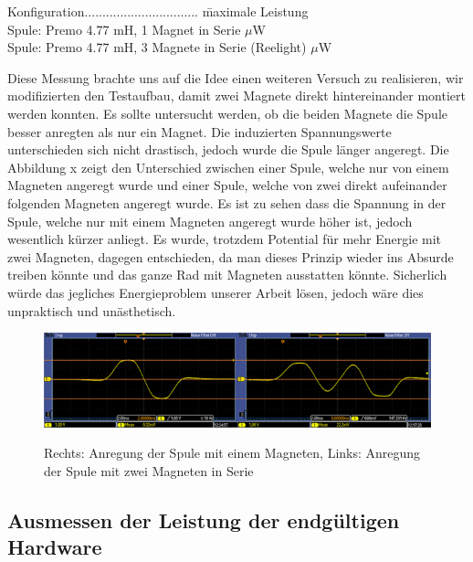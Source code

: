 \begin{tabbing}
    Konfiguration................................   \quad\= maximale Leistung    \\[0.8ex]
    Spule: Premo 4.77 mH, 1 Magnet in Serie         $\mu$W\\
	Spule: Premo 4.77 mH, 3 Magnete in Serie (Reelight)         $\mu$W\\	
\end{tabbing} %


Diese Messung brachte uns auf die Idee einen weiteren Versuch zu realisieren, wir modifizierten den Testaufbau, damit zwei Magnete direkt hintereinander montiert werden konnten. Es sollte untersucht werden, ob die beiden Magnete die Spule besser anregten als nur ein Magnet. Die induzierten Spannungswerte unterschieden sich nicht drastisch, jedoch wurde die Spule länger angeregt. Die Abbildung x zeigt den Unterschied zwischen einer Spule, welche nur von einem Magneten angeregt wurde und einer Spule, welche von zwei direkt aufeinander folgenden Magneten angeregt wurde. Es ist zu sehen dass die Spannung in der Spule, welche nur mit einem Magneten angeregt wurde höher ist, jedoch wesentlich kürzer anliegt. Es wurde, trotzdem Potential für mehr Energie mit zwei Magneten, dagegen entschieden, da man dieses Prinzip wieder ins Absurde treiben könnte und das ganze Rad mit Magneten ausstatten könnte. Sicherlich würde das jegliches Energieproblem unserer Arbeit lösen, jedoch wäre dies unpraktisch und unästhetisch.

\begin{figure}[ht]
  \includegraphics[width=1.0\textwidth]{3Vorgehen/imag/zweiMagneteInSerie.png}
  \label{zweiMagneteInSerie} 
  \caption{Rechts: Anregung der Spule mit einem Magneten, Links: Anregung der Spule mit zwei Magneten in Serie}
\end{figure}


\subsection{Ausmessen der Leistung der endgültigen Hardware}

